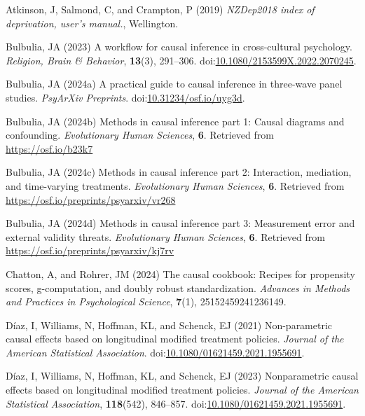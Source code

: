 \documentclass[
  single column]{article}
\newlength{\cslhangindent}
\newenvironment{CSLReferences}[2] %
 {\begin{list}{}{%
  \setlength{\itemindent}{0pt}
  \setlength{\leftmargin}{0pt}
  \setlength{\parsep}{0pt}
  \ifodd #1
   \setlength{\leftmargin}{\cslhangindent}
   \setlength{\itemindent}{-1\cslhangindent}
  \fi
  \setlength{\itemsep}{#2\baselineskip}}}
 {\end{list}}
\begin{document}
\label{refs}
\begin{CSLReferences}{1}{0}
Atkinson, J, Salmond, C, and Crampton, P (2019) \emph{NZDep2018 index of
deprivation, user{'}s manual.}, Wellington.

Bulbulia, JA (2023) A workflow for causal inference in cross-cultural
psychology. \emph{Religion, Brain \& Behavior}, \textbf{13}(3),
291--306.
doi:\href{https://doi.org/10.1080/2153599X.2022.2070245}{10.1080/2153599X.2022.2070245}.

Bulbulia, JA (2024a) A practical guide to causal inference in three-wave
panel studies. \emph{PsyArXiv Preprints}.
doi:\href{https://doi.org/10.31234/osf.io/uyg3d}{10.31234/osf.io/uyg3d}.

Bulbulia, JA (2024b) Methods in causal inference part 1: Causal diagrams
and confounding. \emph{Evolutionary Human Sciences}, \textbf{6}.
Retrieved from \url{https://osf.io/b23k7}

Bulbulia, JA (2024c) Methods in causal inference part 2: Interaction,
mediation, and time-varying treatments. \emph{Evolutionary Human
Sciences}, \textbf{6}. Retrieved from
\url{https://osf.io/preprints/psyarxiv/vr268}

Bulbulia, JA (2024d) Methods in causal inference part 3: Measurement
error and external validity threats. \emph{Evolutionary Human Sciences},
\textbf{6}. Retrieved from \url{https://osf.io/preprints/psyarxiv/kj7rv}

Chatton, A, and Rohrer, JM (2024) The causal cookbook: Recipes for
propensity scores, g-computation, and doubly robust standardization.
\emph{Advances in Methods and Practices in Psychological Science},
\textbf{7}(1), 25152459241236149.

Díaz, I, Williams, N, Hoffman, KL, and Schenck, EJ (2021) Non-parametric
causal effects based on longitudinal modified treatment policies.
\emph{Journal of the American Statistical Association}.
doi:\href{https://doi.org/10.1080/01621459.2021.1955691}{10.1080/01621459.2021.1955691}.

Díaz, I, Williams, N, Hoffman, KL, and Schenck, EJ (2023) Nonparametric
causal effects based on longitudinal modified treatment policies.
\emph{Journal of the American Statistical Association},
\textbf{118}(542), 846--857.
doi:\href{https://doi.org/10.1080/01621459.2021.1955691}{10.1080/01621459.2021.1955691}.


\end{CSLReferences}
\end{document}
